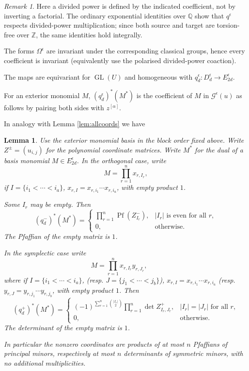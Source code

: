 \documentclass[10pt]{amsart}
\newtheorem{lemma}[theorem]{Lemma}
\theoremstyle{definition}
\theoremstyle{remark}
\newtheorem{remark}[theorem]{Remark}
\newcommand{\Z}{\mathbb Z}
\newcommand{\GL}{\operatorname{GL}}
\begin{document}
\begin{remark}
Here a divided power is defined by the indicated coefficient, not by
inverting a factorial.  The ordinary exponential identities over
$\mathbb Q$ show that $q^\epsilon$ respects divided-power
multiplication; since both source and target are torsion-free over
$\Z$, the same identities hold integrally. 

The forms
$\Omega^\epsilon$ are invariant under the corresponding classical
groups, hence every coefficient is invariant (equivalently use the
polarised divided-power coaction).  \smallskip

The maps are equivariant for
$\GL(U)$ and homogeneous with $q_d^\epsilon:D_d^\epsilon\to E_{2d}^\epsilon$.

For an exterior monomial $M$, $(q_d^\epsilon)^*(M^*)$ is the coefficient of \(M\) in \(\mathcal G^\epsilon(u)\) as follows
 by pairing both sides with $z^{[\alpha]}$.

\end{remark}
In analogy with Lemma \ref{lem:allcoords} we have
\begin{lemma}
\label{lem:classical-transpose}
Use the exterior monomial basis in the
block order fixed above. Write $Z^\pm=(u_{i,j})$ for the polynomial coordinate matrices. Write $M^*$ for the dual of a basis monomial $M\in E_{2d}^\epsilon$.  In the orthogonal case,
write
\[
 M=\prod_{r=1}^n x_{r,I_r},\]
if
$I=\{i_1<\cdots<i_a\}$, 
$x_{r,I}=x_{r,i_1}\cdots x_{r,i_a}$,
with empty product $1$.  

Some $I_r$ may be empty. Then
\begin{equation}\label{eq:classical-all-coordinates}
 (q_d^-)^*(M^*)=
 \begin{cases}
 \displaystyle\prod_{r=1}^n\operatorname{Pf}(Z^-_{I_r}),
       & |I_r|\text{ is even for all }r,\\
 0,&\text{otherwise}.
 \end{cases}
\end{equation}
The Pfaffian of the empty matrix is $1$.\medskip

In the symplectic case write
\[
 M=\prod_{r=1}^n x_{r,I_r}y_{r,J_r},\qquad
\]
where if
$I=\{i_1<\cdots<i_a\}$, (resp.  $J=\{j_1<\cdots<j_b\}$), 
$x_{r,I}=x_{r,i_1}\cdots x_{r,i_a}$ (resp. $y_{r,J}=y_{r,j_1}\cdots y_{r,j_b}$,
with empty product $1$.  
Then
\begin{equation}\label{eq:classical-all-coordinates-plus}
 (q_d^+)^*(M^*)=
 \begin{cases}
 \displaystyle(-1)^{\sum_{r=1}^n\binom{|I_r|}{2}}
 \prod_{r=1}^n\det Z^+_{I_r,J_r},
       & |I_r|=|J_r|\text{ for all }r,\\
 0,&\text{otherwise}.
 \end{cases}
\end{equation}
The determinant of the empty matrix is $1$. \smallskip

 In particular the
nonzero coordinates are products of at most $n$ Pfaffians of principal minors,
respectively at most $n$ determinants of symmetric minors, with no additional
multiplicities. 
\end{lemma}
\end{document}
